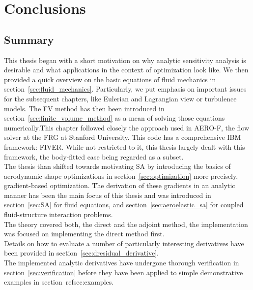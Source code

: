 \documentclass[../main.tex]{subfiles}
\begin{document}
\setlength{\delimitershortfall}{0pt}

\FloatBarrier 
\chapter{Conclusions}\label{sec:conclusions}
\minitoc

\section{Summary}\label{sec:summary}
This thesis began with a short motivation on why analytic sensitivity analysis is desirable and what applications in the context of optimization look like. We then provided a quick overview on the basic equations of fluid mechanics in section~\ref{sec:fluid_mechanics}. Particularly, we put emphasis on important issues for the subsequent chapters, like Eulerian and Lagrangian view or turbulence models.
The \acf{FV} method has then been introduced in section~\ref{sec:finite_volume_method} as a mean of solving those equations numerically.This chapter followed closely the  approach used in AERO-F\cite{Aerof}, the flow solver at the \acf{FRG} at Stanford University. This code has a comprehensive \acf{IBM} framework: \acf{FIVER}\cite{Main2014}. While not restricted to it, this thesis largely dealt with this framework, the body-fitted case being regarded as a subset.\\
The thesis than shifted towards motivating \acf{SA} by introducing the basics of aerodynamic shape optimizations in section~\ref{sec:optimization} more precisely, gradient-based optimization.
The derivation of these gradients in an analytic manner has been the main focus of this thesis and was introduced in section~\ref{sec:SA} for fluid equations, and section~\ref{sec:aeroelastic_sa} for coupled fluid-structure interaction problems.\\
The theory covered both, the direct and the adjoint method, the implementation was focused on implementing the direct method first.\\
Details on how to evaluate a number of particularly interesting derivatives have been provided in section~\ref{sec:dresidual_derivative}.\\
The implemented analytic derivatives have undergone thorough verification in section~\ref{sec:verification} before they have been applied to simple demonstrative examples in section~ref{sec:examples}.
\end{document}
